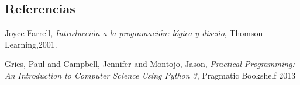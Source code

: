 \documentclass[xcolor=svgnames]{beamer}
\theoremstyle{example}
\begin{document}
\subsection{Referencias}

\begin{thebibliography}{9}
  Joyce Farrell,
 \emph{Introducción a la programación: lógica y diseño},
 Thomson Learning,2001.

  Gries, Paul and Campbell, Jennifer and Montojo, Jason,
  \emph{Practical Programming: An Introduction to Computer Science Using Python 3},
  Pragmatic Bookshelf
  2013
 
\end{thebibliography}
\end{document}
